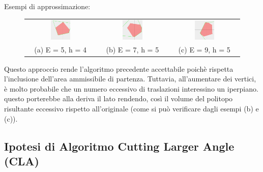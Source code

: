 \begin{center}
    Esempi di approssimazione:
\end{center}
\begin{figure}[H]
    \centering
    \begin{tabular}{ccc}
        \includegraphics[width=0.3\textwidth]{media/CuttingSmallerAngle2/5_4.png} &
        \includegraphics[width=0.3\textwidth]{media/CuttingSmallerAngle2/7_5.png} &
        \includegraphics[width=0.3\textwidth]{media/CuttingSmallerAngle2/9_5.png} \\
        (a) E = 5, h = 4 & (b) E = 7, h = 5 & (c) E = 9, h = 5
    \end{tabular}
\end{figure}

Questo approccio rende l'algoritmo precedente accettabile poichè rispetta l'inclusione
dell'area ammissibile di partenza. Tuttavia, all'aumentare dei vertici, è molto probabile 
che un numero eccessivo di traslazioni interessino un iperpiano. questo porterebbe
alla deriva il lato rendendo, così il volume del politopo risultante eccessivo 
rispetto all'originale (come si può verificare dagli esempi (b) e (c)).


\pagebreak
\subsection{Ipotesi di Algoritmo Cutting Larger Angle (CLA)}

